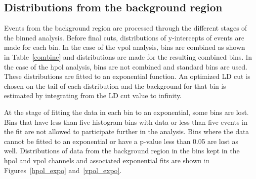 \subsection{Distributions from the background region}

Events from the background region are processed through the different stages of the binned analysis. Before final cuts, distributions of y-intercepts of events are made for each bin. In the case of the \gls{vpol} analysis, bins are combined as shown in Table~\ref{combine} and distributions are made for the resulting combined bins. In the case of the \gls{hpol} analysis, bins are not combined and standard bins are used. These distributions are fitted to an exponential function. An optimized LD cut is chosen on the tail of each distribution and the background for that bin is estimated by integrating from the LD cut value to infinity.

At the stage of fitting the data in each bin to an exponential, some bins are lost. 
Bins that have less than five histogram bins with data or less than five events in the fit are not allowed to participate further in the analysis. Bins where the data cannot be fitted to an exponential or have a p-value less than 0.05 are lost as well. Distributions of data from the background region in the bins kept in the \gls{hpol} and \gls{vpol} channels and associated exponential fits are shown in Figures~\ref{hpol_expo} and~\ref{vpol_expo}.


